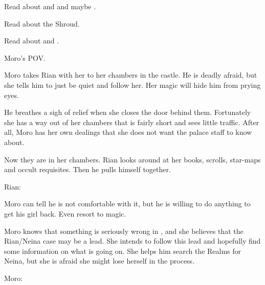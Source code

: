 
Read about  and  and maybe . 

Read about the Shroud. 

Read about  and . 

\begin{comment}
  \section{Telepathic search of the city}
\end{comment}
Moro's POV. 

Moro takes Rian with her to her chambers in the castle. 
He is deadly afraid, but she tells him to just be quiet and follow her.
Her magic will hide him from prying eyes. 

He breathes a sigh of relief when she closes the door behind them. 
Fortunately she has a way out of her chambers that is fairly short and sees little traffic. 
After all, Moro has her own dealings that she does not want the palace staff to know about. 

Now they are in her chambers. 
Rian looks around at her books, scrolls, star-maps and occult requisites. 
Then he pulls himself together. 

Rian:

Moro can tell he is not comfortable with it, but he is willing to do anything to get his girl back.
Even resort to magic. 

Moro knows that something is seriously wrong in \Malcur, and she believes that the Rian/Neina case may be a lead. 
She intends to follow this lead and hopefully find some information on what is going on. 
She helps him search the Realms for Neina, but she is afraid she might lose herself in the process. 

Moro:

